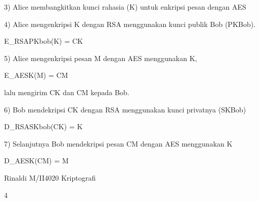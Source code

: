 \documentclass{article}
\begin{document}

3) Alice membangkitkan kunci rahasia (K) untuk enkripsi pesan dengan AES

   4) Alice mengenkripsi K dengan RSA menggunakan kunci publik Bob (PKBob). 



E\_RSAPKbob(K) = CK

    5) Alice mengenkripsi pesan M dengan AES menggunakan K, 



E\_AESK(M) = CM

        lalu mengirim CK dan CM kepada Bob. 

    6) Bob mendekripsi CK dengan RSA menggunakan kunci privatnya (SKBob)


             D\_RSASKbob(CK) = K

    7)  Selanjutnya Bob mendekripsi pesan CM dengan AES menggunakan K



D\_AESK(CM) = M

Rinaldi M/II4020 Kriptografi

4
\end{document}
